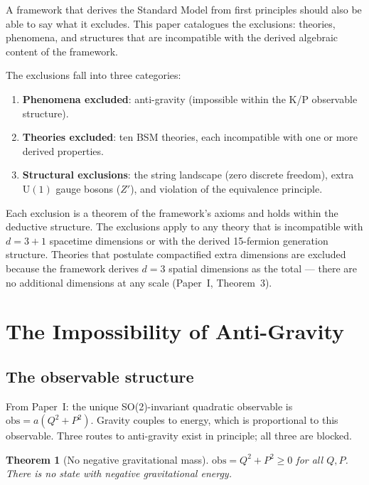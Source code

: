 \documentclass[11pt,letterpaper]{article}
\newtheorem{theorem}{Theorem}
\begin{document}
A framework that derives the Standard Model from first principles
should also be able to say what it excludes. This paper catalogues
the exclusions: theories, phenomena, and structures that are
incompatible with the derived algebraic content of the framework.

The exclusions fall into three categories:
\begin{enumerate}[label=(\roman*),nosep]
  \item \textbf{Phenomena excluded}: anti-gravity (impossible within the
    K/P observable structure).
  \item \textbf{Theories excluded}: ten BSM theories, each incompatible
    with one or more derived properties.
  \item \textbf{Structural exclusions}: the string landscape (zero
    discrete freedom), extra $\mathrm{U}(1)$ gauge bosons ($Z'$),
    and violation of the equivalence principle.
\end{enumerate}

Each exclusion is a theorem of the framework's axioms and holds
within the deductive structure.  The exclusions apply to any theory
that is incompatible with $d = 3{+}1$ spacetime dimensions or with
the derived 15-fermion generation structure.  Theories that postulate
compactified extra dimensions are excluded because the framework
derives $d = 3$ spatial dimensions as the total --- there are no
additional dimensions at any scale
(Paper~I, Theorem~3).

\section{The Impossibility of Anti-Gravity}

\subsection{The observable structure}

From Paper~I: the unique SO(2)-invariant quadratic observable is
$\mathrm{obs} = a(Q^2 + P^2)$. Gravity couples to energy, which is
proportional to this observable. Three routes to anti-gravity exist in
principle; all three are blocked.

\begin{theorem}[No negative gravitational mass]
\label{thm:nonneg}
$\mathrm{obs} = Q^2 + P^2 \geq 0$ for all $Q, P$. There is no state
with negative gravitational energy.
\end{theorem}
\end{document}
